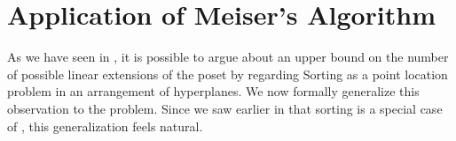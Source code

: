 \chapter{Application of Meiser's Algorithm}

As we have seen in , it is possible to argue about an
upper bound on the number of possible linear extensions of the poset \XY by
regarding Sorting \XY as a point location problem in an
arrangement of hyperplanes. We now formally generalize this observation
to the \kSUM problem. Since we saw earlier in  that
sorting \XY is a special case of \fourLDT, this generalization feels natural.
